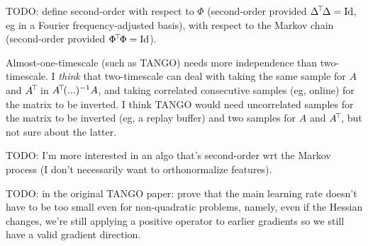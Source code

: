 \documentclass[11pt,a4paper]{article}
\begin{document}
TODO: define second-order with respect to $\Phi$ (second-order
provided $\Delta^{\!\top}\!\Delta=\operatorname{Id}$, eg in a Fourier frequency-adjusted
basis), with respect to the Markov chain (second-order provided
$\Phi^{\!\top}\!\Phi=\operatorname{Id}$).

Almost-one-timescale (such as TANGO) needs more independence than two-timescale. I
\emph{think} that two-timescale can deal with taking the same sample for
$A$ and $A^{\!\top}\!$ in $A^{\!\top}\!(...)^{-1}A$, and taking correlated
consecutive samples (eg, online) for the matrix to be inverted. I think
TANGO would need uncorrelated samples for the matrix to be inverted (eg,
a replay buffer) and two samples for $A$ and $A^{\!\top}\!$, but not sure
about the latter.

TODO: I'm more interested in an algo that's second-order wrt the Markov
process (I don't necessarily want to orthonormalize features).

TODO: in the original TANGO paper: prove that the main learning rate
doesn't have to be too small even for non-quadratic problems, namely,
even if the Hessian changes, we're still applying a positive operator to
earlier gradients so we still have a valid gradient direction.
\end{document}

